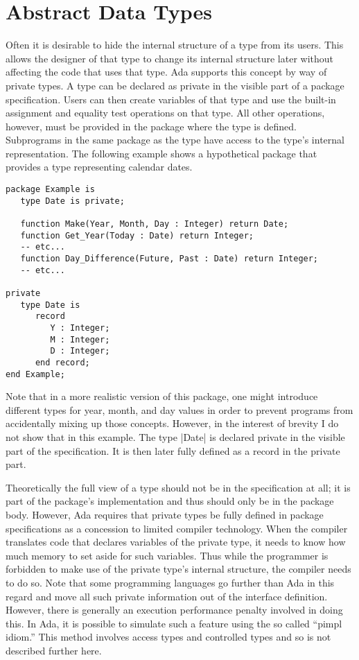 \section{Abstract Data Types}

Often it is desirable to hide the internal structure of a type from its users. This allows the
designer of that type to change its internal structure later without affecting the code that
uses that type. Ada supports this concept by way of private types. A type can be declared as
private in the visible part of a package specification. Users can then create variables of that
type and use the built-in assignment and equality test operations on that type. All other
operations, however, must be provided in the package where the type is defined. Subprograms in
the same package as the type have access to the type's internal representation. The following
example shows a hypothetical package that provides a type representing calendar dates.

\begin{lstlisting}
package Example is
   type Date is private;

   function Make(Year, Month, Day : Integer) return Date;
   function Get_Year(Today : Date) return Integer;
   -- etc...
   function Day_Difference(Future, Past : Date) return Integer;
   -- etc...

private
   type Date is
      record
         Y : Integer;
         M : Integer;
         D : Integer;
      end record;
end Example;
\end{lstlisting}

Note that in a more realistic version of this package, one might introduce different types for
year, month, and day values in order to prevent programs from accidentally mixing up those
concepts. However, in the interest of brevity I do not show that in this example. The type
|Date| is declared private in the visible part of the specification. It is then later fully
defined as a record in the private part.

Theoretically the full view of a type should not be in the specification at all; it is part of
the package's implementation and thus should only be in the package body. However, Ada requires
that private types be fully defined in package specifications as a concession to limited
compiler technology. When the compiler translates code that declares variables of the private
type, it needs to know how much memory to set aside for such variables. Thus while the
programmer is forbidden to make use of the private type's internal structure, the compiler needs
to do so. Note that some programming languages go further than Ada in this regard and move all
such private information out of the interface definition. However, there is generally an
execution performance penalty involved in doing this. In Ada, it is possible to simulate such a
feature using the so called ``pimpl idiom.'' This method involves access types and controlled
types and so is not described further here.

